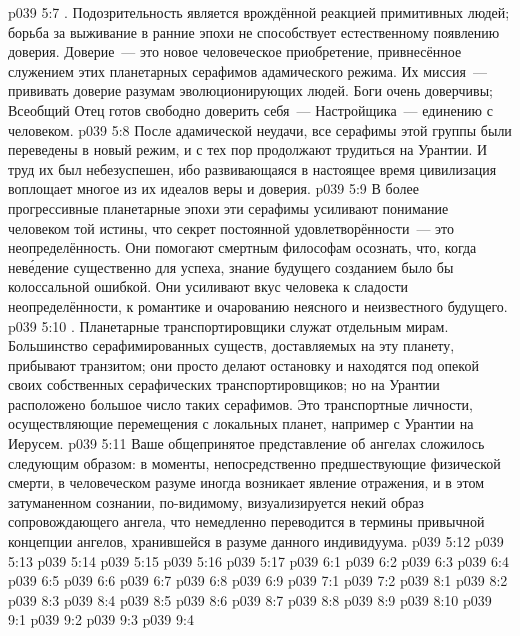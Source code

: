 \vs p039 5:7 . Подозрительность является врождённой реакцией примитивных людей; борьба за выживание в ранние эпохи не способствует естественному появлению доверия. Доверие~--- это новое человеческое приобретение, привнесённое служением этих планетарных серафимов адамического режима. Их миссия~--- прививать доверие разумам эволюционирующих людей. Боги очень доверчивы; Всеобщий Отец готов свободно доверить себя~--- Настройщика~--- единению с человеком.
\vs p039 5:8 После адамической неудачи, все серафимы этой группы были переведены в новый режим, и с тех пор продолжают трудиться на Урантии. И труд их был небезуспешен, ибо развивающаяся в настоящее время цивилизация воплощает многое из их идеалов веры и доверия.
\vs p039 5:9 В более прогрессивные планетарные эпохи эти серафимы усиливают понимание человеком той истины, что секрет постоянной удовлетворённости~--- это неопределённость. Они помогают смертным философам осознать, что, когда нев\'едение существенно для успеха, знание будущего созданием было бы колоссальной ошибкой. Они усиливают вкус человека к сладости неопределённости, к романтике и очарованию неясного и неизвестного будущего.
\vs p039 5:10 . Планетарные транспортировщики служат отдельным мирам. Большинство серафимированных существ, доставляемых на эту планету, прибывают транзитом; они просто делают остановку и находятся под опекой своих собственных серафических транспортировщиков; но на Урантии расположено большое число таких серафимов. Это транспортные личности, осуществляющие перемещения с локальных планет, например с Урантии на Иерусем.
\vs p039 5:11 \pc Ваше общепринятое представление об ангелах сложилось следующим образом: в моменты, непосредственно предшествующие физической смерти, в человеческом разуме иногда возникает явление отражения, и в этом затуманенном сознании, по\hyp{}видимому, визуализируется некий образ сопровождающего ангела, что немедленно переводится в термины привычной концепции ангелов, хранившейся в разуме данного индивидуума.
\vs p039 5:12 
\vs p039 5:13 \pc 
\vs p039 5:14 
\vs p039 5:15 \pc 
\vs p039 5:16 
\vs p039 5:17 
\vs p039 6:1 
\vs p039 6:2 
\vs p039 6:3 
\vs p039 6:4 
\vs p039 6:5 
\vs p039 6:6 
\vs p039 6:7 
\vs p039 6:8 
\vs p039 6:9 \pc 
{}
\vs p039 7:1 
\vs p039 7:2 
\vs p039 8:1 
\vs p039 8:2 \pc 
\vs p039 8:3 
\vs p039 8:4 
\vs p039 8:5 
\vs p039 8:6 
\vs p039 8:7 \pc 
\vs p039 8:8 
\vs p039 8:9 \pc 
\vs p039 8:10 
\vs p039 9:1 
\vs p039 9:2 
\vs p039 9:3 
\vsetoff
\vs p039 9:4 
\quizlink
